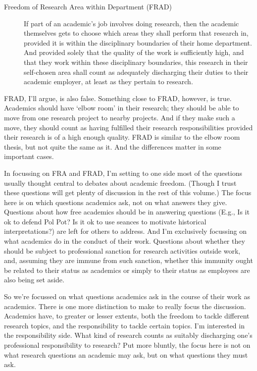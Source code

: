 \begin{description}

\item[Freedom of Research Area within Department (FRAD)]

If part of an academic's job involves doing research, then the academic themselves gets to choose which areas they shall perform that research in, provided it is within the disciplinary boundaries of their home department. And provided solely that the quality of the work is sufficiently high, and that they work within these disciplinary boundaries, this research in their self-chosen area shall count as adequately discharging their duties to their academic employer, at least as they pertain to research.
\end{description}
FRAD, I'll argue, is also false. Something close to FRAD, however, is true. Academics should have `elbow room' in their research; they should be able to move from one research project to nearby projects. And if they make such a move, they should count as having fulfilled their research responsibilities provided their research is of a high enough quality. FRAD is similar to the elbow room thesis, but not quite the same as it. And the differences matter in some important cases.

In focussing on FRA and FRAD, I'm setting to one side most of the questions usually thought central to debates about academic freedom. (Though I trust these questions will get plenty of discussion in the rest of this volume.) The focus here is on which questions academics ask, not on what answers they give. Questions about how free academics should be in answering questions (E.g., Is it ok to defend Pol Pot? Is it ok to use seances to motivate historical interpretations?) are left for others to address. And I'm exclusively focussing on what academics do in the conduct of their work. Questions about whether they should be subject to professional sanction for research activities outside work, and, assuming they are immune from such sanction, whether this immunity ought be related to their status as academics or simply to their status as employees are also being set aside.

So we're focussed on what questions academics ask in the course of their work as academics. There is one more distinction to make to really focus the discussion. Academics have, to greater or lesser extents, both the freedom to tackle different research topics, and the responsibility to tackle certain topics. I'm interested in the responsibility side. What kind of research counts as suitably discharging one's professional responsibility to research? Put more bluntly, the focus here is not on what research questions an academic may ask, but on what questions they must ask.

